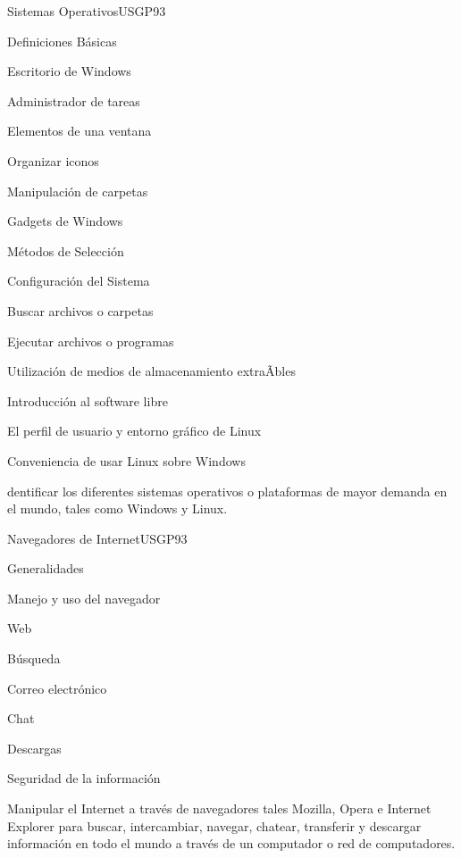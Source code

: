 \begin{syllabus}
\begin{unit}{Sistemas Operativos}{USGP}{9}{3}
\begin{topics}
      \item Definiciones Básicas
      \item Escritorio de Windows
      \item Administrador de tareas
      \item Elementos de una ventana
      \item Organizar iconos
      \item Manipulación de carpetas
      \item Gadgets de Windows 
      \item Métodos de Selección
      \item Configuración del Sistema
      \item Buscar archivos o carpetas
      \item Ejecutar archivos o programas
      \item Utilización de medios de almacenamiento extraÃ­bles
      \item Introducción al software libre
      \item El perfil de usuario y entorno gráfico de Linux
      \item Conveniencia de usar Linux sobre Windows
\end{topics}
\begin{unitgoals}
   \item dentificar los diferentes sistemas operativos o plataformas de mayor demanda en el mundo, tales como Windows y Linux.
\end{unitgoals}
\end{unit}

\begin{unit}{Navegadores de Internet}{USGP}{9}{3}
\begin{topics}
      \item Generalidades
      \item Manejo y uso del navegador
      \item Web
      \item Búsqueda
      \item Correo electrónico
      \item Chat
      \item Descargas
      \item Seguridad de la información
\end{topics}
\begin{unitgoals}
   \item Manipular el Internet a través de navegadores tales Mozilla, Opera e Internet Explorer para buscar, intercambiar, navegar, chatear, transferir y descargar información en todo el mundo a través de un computador o red de computadores.
\end{unitgoals}
\end{unit}


\end{syllabus}
